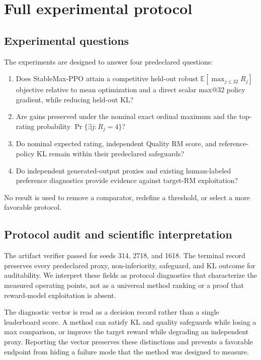 
\section{Full experimental protocol}
\label{app:full-experiments}

\subsection{Experimental questions}
\label{subsec:experimental-questions}

The experiments are designed to answer four predeclared questions:

\begin{enumerate}
\item Does StableMax-PPO attain a competitive held-out robust
\(\mathbb E[\max_{j\le32}R_j]\) objective relative to
mean optimization and a direct scalar max@32 policy gradient, while
reducing held-out KL?
\item Are gains preserved under the nominal exact ordinal maximum and the
top-rating probability \(\Pr\{\exists j:R_j=4\}\)?
\item Do nominal expected rating, independent Quality RM score, and
reference-policy KL remain within their predeclared safeguards?
\item Do independent generated-output proxies and existing human-labeled
preference diagnostics provide evidence against target-RM exploitation?
\end{enumerate}

No result is used to remove a comparator, redefine a threshold, or select a more
favorable protocol.

\subsection{Protocol audit and scientific interpretation}
\label{subsec:gate-outcomes}

The artifact verifier passed for seeds 314, 2718, and 1618.  The terminal
record preserves every predeclared proxy, non-inferiority, safeguard, and KL
outcome for auditability. We interpret these fields as protocol diagnostics
that characterize the measured operating points, not as a universal method
ranking or a proof that reward-model exploitation is absent.

The diagnostic vector is read as a decision record rather than a single
leaderboard score.  A method can satisfy KL and quality safeguards while
losing a max comparison, or improve the target reward while degrading an
independent proxy.  Reporting the vector preserves these distinctions and
prevents a favorable endpoint from hiding a failure mode that the method was
designed to measure.

